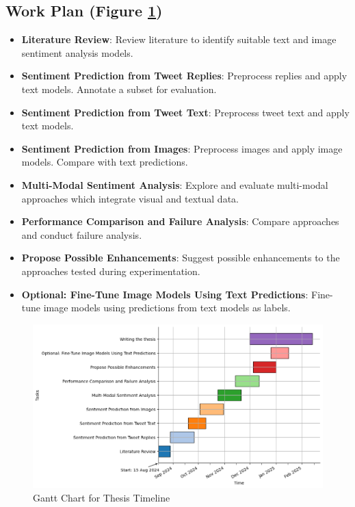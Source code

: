\documentclass[a4paper]{scrartcl}
\begin{document}
\subsection{Work Plan (Figure \ref{fig:gantt_chart})}\label{subsec:work-plan}
\begin{itemize}
    \item \textbf{Literature Review}: Review literature to identify suitable text and image sentiment analysis models.
    \item \textbf{Sentiment Prediction from Tweet Replies}: Preprocess replies and apply text models.
    Annotate a subset for evaluation.
    \item \textbf{Sentiment Prediction from Tweet Text}: Preprocess tweet text and apply text models.
    \item \textbf{Sentiment Prediction from Images}: Preprocess images and apply image models.
    Compare with text predictions.
    \item \textbf{Multi-Modal Sentiment Analysis}: Explore and evaluate multi-modal approaches which integrate visual and textual data.
    \item \textbf{Performance Comparison and Failure Analysis}: Compare approaches and conduct failure analysis.
    \item \textbf{Propose Possible Enhancements}: Suggest possible enhancements to the approaches tested during experimentation.
    \item \textbf{Optional: Fine-Tune Image Models Using Text Predictions}: Fine-tune image models using predictions from text models as labels.
    
\end{itemize}


\begin{figure}[ht]
    \centering
    \includegraphics[width=\linewidth, height=0.3\textheight]{gantt}
    \caption{Gantt Chart for Thesis Timeline}
    \label{fig:gantt_chart}
\end{figure}

\newpage


\end{document}
